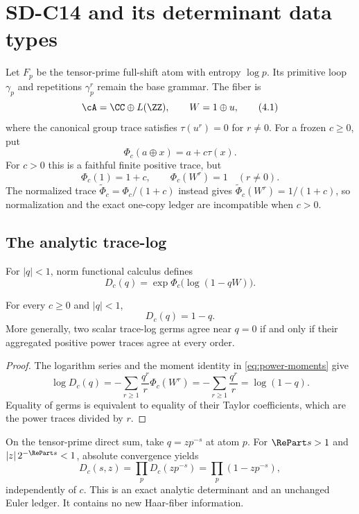 \section{SD-C14 and its determinant data types}
\label{sec:determinants}

Let $F_p$ be the tensor-prime full-shift atom with entropy $\log p$.  Its
primitive loop $\gamma_p$ and repetitions $\gamma_p^r$ remain the base
grammar.  The fiber is
\[
 \cA=\CC\oplus L(\ZZ),\qquad W=1\oplus u,                 \tag{4.1}
\]
where the canonical group trace satisfies $\tau(u^r)=0$ for $r\ne0$.  For a
frozen $c\ge0$, put
\[
 \Phi_c(a\oplus x)=a+c\tau(x).                             \tag{4.2}
\]
For $c>0$ this is a faithful finite positive trace, but
\[
 \Phi_c(1)=1+c,\qquad \Phi_c(W^r)=1\quad(r\ne0).
 \tag{4.3}\label{eq:power-moments}
\]
The normalized trace $\widetilde\Phi_c=\Phi_c/(1+c)$ instead gives
$\widetilde\Phi_c(W^r)=1/(1+c)$, so normalization and the exact one-copy
ledger are incompatible when $c>0$.

\subsection{The analytic trace-log}

For $|q|<1$, norm functional calculus defines
\[
 D_c(q)=\exp\Phi_c\bigl(\log(1-qW)\bigr).                 \tag{4.4}
\]

\begin{theorem}
\label{thm:blindness}
For every $c\ge0$ and $|q|<1$,
\[
 D_c(q)=1-q.                                               \tag{4.5}
\]
More generally, two scalar trace-log germs agree near $q=0$ if and only if
their aggregated positive power traces agree at every order.
\end{theorem}

\begin{proof}
The logarithm series and the moment identity in
\eqref{eq:power-moments} give
\[
 \log D_c(q)
 =-\sum_{r\ge1}\frac{q^r}{r}\Phi_c(W^r)
 =-\sum_{r\ge1}\frac{q^r}{r}=\log(1-q).                  \tag{4.6}
\]
Equality of germs is equivalent to equality of their Taylor coefficients,
which are the power traces divided by $r$.
\end{proof}

On the tensor-prime direct sum, take $q=zp^{-s}$ at atom $p$.  For
$\RePart s>1$ and $|z|\,2^{-\RePart s}<1$, absolute convergence yields
\[
 D_c(s,z)=\prod_pD_c(zp^{-s})=\prod_p(1-zp^{-s}),         \tag{4.7}
\]
independently of $c$.  This is an exact analytic determinant and an unchanged
Euler ledger.  It contains no new Haar-fiber information.

